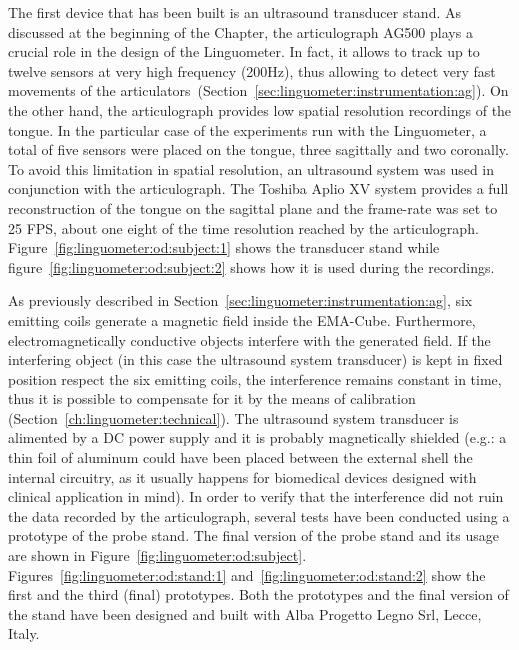 The first device that has been built is an ultrasound transducer stand.
As discussed at the beginning of the Chapter, the articulograph AG500 plays a
crucial role in the design of the Linguometer. 
In fact, it allows to track up to twelve sensors at very high frequency (200Hz),
thus allowing to detect very fast movements of the
articulators~(Section~\ref{sec:linguometer:instrumentation:ag}).
On the other hand, the articulograph provides low spatial resolution recordings
of the tongue.
In the particular case of the experiments run with the Linguometer, a total of 
five sensors were placed on the tongue, three sagittally and two coronally.
To avoid this limitation in spatial resolution, an ultrasound system was used 
in conjunction with the articulograph.
The Toshiba Aplio XV system provides a full reconstruction of the tongue on the
sagittal plane and the frame-rate was set to 25 FPS, about one eight of the time
resolution reached by the articulograph.
Figure~\ref{fig:linguometer:od:subject:1} shows the transducer stand
while figure~\ref{fig:linguometer:od:subject:2} shows how it is used during the
recordings.


As previously described in Section~\ref{sec:linguometer:instrumentation:ag},
six emitting coils generate a magnetic field inside the EMA-Cube.
Furthermore, electromagnetically conductive objects interfere with
the generated field.
If the interfering object (in this case the ultrasound system transducer) 
is kept in fixed position respect the six emitting coils, the interference
remains  constant in time, thus it is possible to compensate
for it by the means of calibration (Section~\ref{ch:linguometer:technical}).
The ultrasound system transducer is alimented by a DC power supply and it is
probably magnetically shielded (e.g.: a thin foil of aluminum could have been
placed between the external shell the internal circuitry, as it usually 
happens for biomedical devices designed with clinical application in mind).
In order to verify that the interference did not ruin the data recorded by 
the articulograph, several tests have been conducted using a prototype of the
probe stand.
The final version of the probe stand and its usage are shown in 
Figure~\ref{fig:linguometer:od:subject}.
Figures~\ref{fig:linguometer:od:stand:1} 
and~\ref{fig:linguometer:od:stand:2} show the first and the third (final)
prototypes.
Both the prototypes and the final version of the stand have been designed 
and built with Alba Progetto Legno Srl, Lecce, Italy. 

